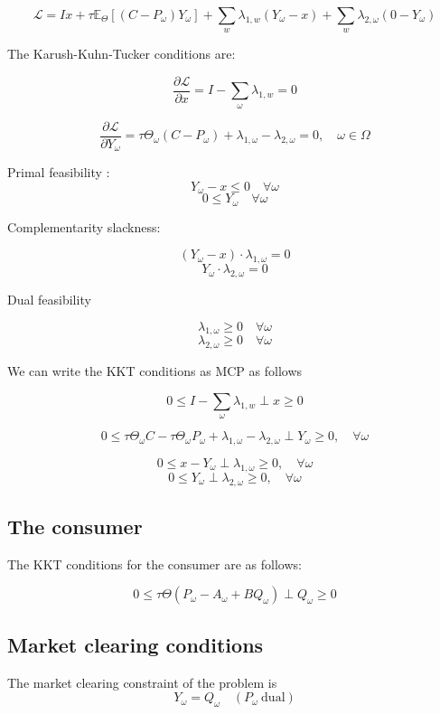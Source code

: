 \documentclass[11pt, letterpaper]{article}
\begin{document}
\begin{appendices}
\[ \mathcal{L}= Ix + \tau \mathbb{E}_\Theta [(C-P_\omega) Y_\omega ] + \sum_w \lambda_{1,w} (Y_\omega -x) + \sum_w \lambda_{2,\omega}(0-Y_\omega) \]

The Karush-Kuhn-Tucker conditions  are:

\[ \frac{\partial \mathcal{L}}{\partial x}= I- \sum_{\omega}\lambda_{1,w} = 0  \]

\[\frac{\partial \mathcal{L}}{\partial Y_{\omega}} = \tau \Theta_\omega ( C - P_\omega ) + \lambda_{1, \omega} - \lambda_{2,\omega} =  0,\quad\omega\in\Omega \]

\vspace{1cm}

Primal feasibility :
\[ Y_\omega - x \leq 0 \quad  \forall \omega  \]
\[ 0 \leq Y_\omega \quad \forall \omega \]

Complementarity slackness: 

\[ (Y_\omega - x) \cdot \lambda_{1,\omega} = 0 \]
\[ Y_\omega \cdot \lambda_{2,\omega} = 0\]

Dual feasibility

\[ \lambda_{1,\omega} \geq 0 \quad \forall \omega \]
\[ \lambda_{2,\omega} \geq 0 \quad \forall \omega \]

We can write the KKT conditions as MCP as follows

\[ 0 \leq I- \sum_{\omega}\lambda_{1,w} \perp x \geq 0 \] 

\[ 0 \leq \tau \Theta_\omega C - \tau \Theta_\omega P_\omega + \lambda_{1,\omega} - \lambda_{2,\omega} \perp Y_\omega \geq 0, \quad \forall \omega\]

\[ 0 \leq x - Y_\omega \perp \lambda_{1,\omega} \geq 0 , \quad \forall \omega \]
\[ 0 \leq Y_\omega \perp \lambda_{2,\omega} \geq 0, \quad \forall \omega \]

\subsection{The consumer}

The KKT conditions for the consumer are as follows:

\[ 0 \leq \tau \Theta (P_\omega - A_\omega + B Q_\omega) \perp Q_\omega \geq 0\]




\subsection{Market clearing conditions}
 
 The market clearing constraint of the problem is 
\[ Y_\omega = Q_\omega \quad (P_\omega \  \textrm{dual})\]


\end{appendices}


\nocite{*}


\end{document}
